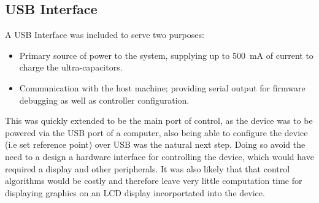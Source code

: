 \subsection{USB Interface}
A USB Interface was included to serve two purposes:
\begin{itemize}
    \item Primary source of power to the system, supplying up to \SI{500}{mA} of current to charge the ultra-capacitors.
    \item Communication with the host machine; providing serial output for firmware debugging as well as controller configuration.
\end{itemize}

This was quickly extended to be the main port of control, as the device was to be powered via the USB port of a computer, also being able to configure the device (i.e set reference point) over USB was the natural next step. Doing so avoid the need to a design a hardware interface for controlling the device, which would have required a display and other peripherals. It was also likely that that control algorithms would be costly and therefore leave very little computation time for displaying graphics on an LCD display incorportated into the device.

